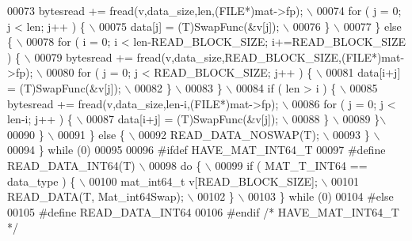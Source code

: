 \begin{DoxyCode}
00073 \textcolor{preprocessor}{                bytesread += fread(v,data\_size,len,(FILE*)mat->fp); \(\backslash\)}
00074 \textcolor{preprocessor}{                for ( j = 0; j < len; j++ ) \{ \(\backslash\)}
00075 \textcolor{preprocessor}{                    data[j] = (T)SwapFunc(&v[j]); \(\backslash\)}
00076 \textcolor{preprocessor}{                \} \(\backslash\)}
00077 \textcolor{preprocessor}{            \} else \{ \(\backslash\)}
00078 \textcolor{preprocessor}{                for ( i = 0; i < len-READ\_BLOCK\_SIZE; i+=READ\_BLOCK\_SIZE ) \{ \(\backslash\)}
00079 \textcolor{preprocessor}{                    bytesread += fread(v,data\_size,READ\_BLOCK\_SIZE,(FILE*)mat->fp); \(\backslash\)}
00080 \textcolor{preprocessor}{                    for ( j = 0; j < READ\_BLOCK\_SIZE; j++ ) \{ \(\backslash\)}
00081 \textcolor{preprocessor}{                        data[i+j] = (T)SwapFunc(&v[j]); \(\backslash\)}
00082 \textcolor{preprocessor}{                    \} \(\backslash\)}
00083 \textcolor{preprocessor}{                \} \(\backslash\)}
00084 \textcolor{preprocessor}{                if ( len > i ) \{ \(\backslash\)}
00085 \textcolor{preprocessor}{                    bytesread += fread(v,data\_size,len-i,(FILE*)mat->fp); \(\backslash\)}
00086 \textcolor{preprocessor}{                    for ( j = 0; j < len-i; j++ ) \{ \(\backslash\)}
00087 \textcolor{preprocessor}{                        data[i+j] = (T)SwapFunc(&v[j]); \(\backslash\)}
00088 \textcolor{preprocessor}{                    \} \(\backslash\)}
00089 \textcolor{preprocessor}{                \}\(\backslash\)}
00090 \textcolor{preprocessor}{            \} \(\backslash\)}
00091 \textcolor{preprocessor}{        \} else \{ \(\backslash\)}
00092 \textcolor{preprocessor}{            READ\_DATA\_NOSWAP(T); \(\backslash\)}
00093 \textcolor{preprocessor}{        \} \(\backslash\)}
00094 \textcolor{preprocessor}{    \} while (0)}
00095 
00096 \textcolor{preprocessor}{#ifdef HAVE\_MAT\_INT64\_T}
00097 \textcolor{preprocessor}{#define READ\_DATA\_INT64(T) \(\backslash\)}
00098 \textcolor{preprocessor}{    do \{ \(\backslash\)}
00099 \textcolor{preprocessor}{        if ( MAT\_T\_INT64 == data\_type ) \{ \(\backslash\)}
00100 \textcolor{preprocessor}{            mat\_int64\_t v[READ\_BLOCK\_SIZE]; \(\backslash\)}
00101 \textcolor{preprocessor}{            READ\_DATA(T, Mat\_int64Swap); \(\backslash\)}
00102 \textcolor{preprocessor}{        \} \(\backslash\)}
00103 \textcolor{preprocessor}{    \} while (0)}
00104 \textcolor{preprocessor}{#else}
00105 \textcolor{preprocessor}{#define READ\_DATA\_INT64}
00106 \textcolor{preprocessor}{#endif }\textcolor{comment}{/* HAVE\_MAT\_INT64\_T */}\textcolor{preprocessor}{}

\end{DoxyCode}
